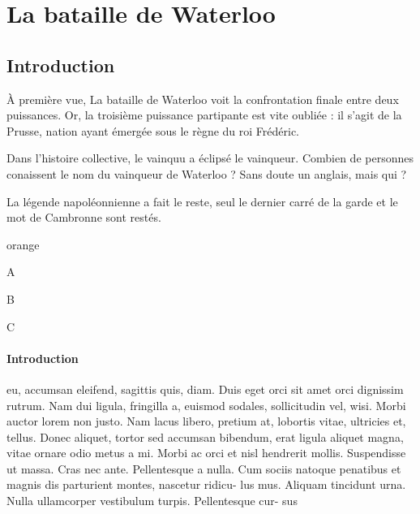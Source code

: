   
\chapter{La bataille de Waterloo}

\section{Introduction}

À première vue, La bataille de Waterloo voit la confrontation finale entre deux puissances. Or, la troisième puissance partipante est vite oubliée : il s'agit de la Prusse, nation ayant émergée sous le règne du roi Frédéric.

Dans l'histoire collective, le vainquu a éclipsé le vainqueur. Combien de personnes conaissent le nom du vainqueur de Waterloo ? Sans doute un anglais, mais qui ?

La légende napoléonnienne a fait le reste, seul le dernier carré de la garde et le mot de Cambronne sont restés.



\begin{items}{orange}{\Triangle}
    \item A
    \item B
    \item C
\end{items}

\subsubsection{Introduction}

eu, accumsan eleifend, sagittis quis, diam. Duis eget orci sit amet orci dignissim rutrum.
Nam dui ligula, fringilla a, euismod sodales, sollicitudin vel, wisi. Morbi auctor lorem
non justo. Nam lacus libero, pretium at, lobortis vitae, ultricies et, tellus. Donec aliquet,
tortor sed accumsan bibendum, erat ligula aliquet magna, vitae ornare odio metus a mi.
Morbi ac orci et nisl hendrerit mollis. Suspendisse ut massa. Cras nec ante. Pellentesque
a nulla. Cum sociis natoque penatibus et magnis dis parturient montes, nascetur ridicu-
lus mus. Aliquam tincidunt urna. Nulla ullamcorper vestibulum turpis. Pellentesque cur-
sus



